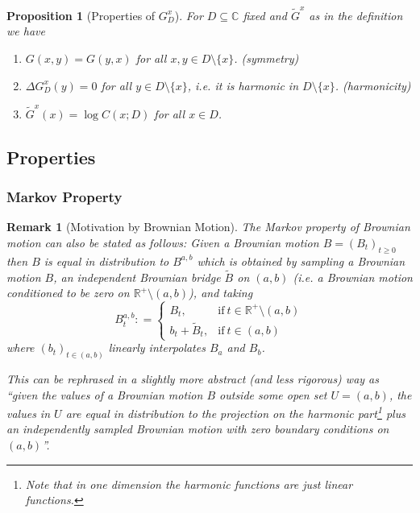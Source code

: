 \documentclass[11pt,reqno]{amsart}
\numberwithin{equation}{section}
\newtheorem{pro}[thm]{Proposition}
\newtheorem{rem}[thm]{Remark}
\newcommand{\deq}{\mathrel{\mathop:}=}
\begin{document}
\begin{pro}[Properties of $G_D^x$]\label{prop:propertiesofGreensfcts} For $D\subseteq\mathbb C$ fixed and $\tilde G^x$ as in the definition we have
	\begin{enumerate}
		\item $G(x,y) = G(y,x)$ for all $x,y\in D\setminus\{x\}$. (symmetry)
		\item $\Delta G_D^x(y)=0$ for all $y\in D\setminus\{x\}$, i.e. it is harmonic in $D\setminus\{x\}$. (harmonicity)
		\item\label{item:GreensfctatXisconfRadius} $\tilde G^x(x)=\log C(x;D)$ for all $x\in D$.
	\end{enumerate}
\end{pro}

\subsection{Properties}




\subsubsection{Markov Property}

\begin{rem}[Motivation by Brownian Motion]\label{rem:alternativeMarkovforBM}
	The Markov property of Brownian motion can also be stated as follows: Given a Brownian motion $B=(B_t)_{t\geq 0}$ then $B$ is equal in distribution to $B^{a,b}$ which is obtained by sampling a Brownian motion $B$, an independent Brownian bridge $\tilde B$ on $(a,b)$ (i.e. a Brownian motion conditioned to be zero on $\mathbb R^+\setminus(a,b)$), and taking
	$$B^{a,b}_t\deq \begin{cases}
      B_t, & \text{if}\ t\in\mathbb R^+\setminus(a,b) \\
      b_t+\tilde B_t, & \text{if}\ t\in(a,b)
    \end{cases}$$ where $(b_t)_{t\in(a,b)}$ linearly interpolates $B_a$ and $B_b$.
	
	This can be rephrased in a slightly more abstract (and less rigorous) way as ``given the values of a Brownian motion $B$ outside some open set $U=(a,b)$, the values in $U$ are equal in distribution to the projection on the harmonic part\footnote{Note that in one dimension the harmonic functions are just linear functions.} plus an independently sampled Brownian motion with zero boundary conditions on $(a,b)$''.
\end{rem}
\end{document}
